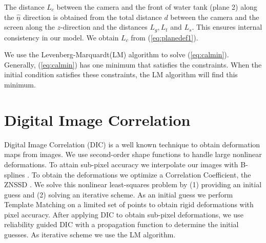 \documentclass[draft]{svjour3}                     %
\begin{document}
The distance $L_c$ between the camera and the front of water tank (plane 2) along the $\underline{\hat{n}}$ direction is obtained from the total distance $d$ between the camera and the screen along the $z$-direction and the distances $L_g, L_t$ and $L_s$. This ensures internal consistency in our model. We obtain $L_c$ from (\ref{eq:planedef1}).

We use the Levenberg-Marquardt(LM) algorithm to solve (\ref{eq:calmin}). Generally, (\ref{eq:calmin}) has one minimum that satisfies the constraints. When the initial condition satisfies these constraints, the LM algorithm will find this minimum.


\section{Digital Image Correlation}
\label{sec:DIC}
Digital Image Correlation (DIC) is a well known technique \cite{sutton2009image} to obtain deformation maps from images. We use second-order shape functions \cite{lu2000deformation} to handle large nonlinear deformations. To attain sub-pixel accuracy we interpolate our images with B-splines \cite{thevenaz2000interpolation, unser1999splines}. To obtain the deformations we optimize a Correlation Coefficient, the ZNSSD \cite{sutton2009image}. We solve this nonlinear least-squares problem  by (1) providing an initial guess and (2) solving an iterative scheme. As an initial guess we perform Template Matching \cite{lewis1995industrial,opencv_library} on a limited set of points to obtain rigid deformations with pixel accuracy. After applying DIC to obtain sub-pixel deformations, we use reliability guided DIC \cite{pan2012incremental} with a propagation function \cite{zhou2012propagation} to determine the initial guesses. As iterative scheme we use the LM algorithm. 
\end{document}
